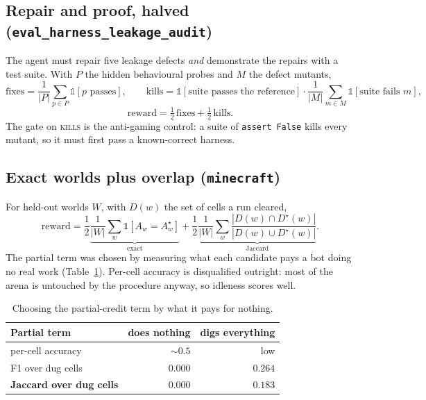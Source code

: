 \documentclass[11pt,a4paper]{article}
\newcommand{\task}[1]{\texttt{#1}}
\begin{document}
\subsection{Repair and proof, halved (\task{eval\_harness\_leakage\_audit})}

The agent must repair five leakage defects \emph{and} demonstrate the repairs with a
test suite. With $P$ the hidden behavioural probes and $M$ the defect mutants,
\begin{equation}
\mathrm{fixes} = \frac{1}{|P|}\sum_{p \in P} \mathbb{1}[p \text{ passes}],
\qquad
\mathrm{kills} = \mathbb{1}[\text{suite passes the reference}] \cdot \frac{1}{|M|}\sum_{m \in M} \mathbb{1}[\text{suite fails } m],
\end{equation}
\begin{equation}
\mathrm{reward} = \tfrac{1}{2}\,\mathrm{fixes} + \tfrac{1}{2}\,\mathrm{kills}.
\end{equation}
The gate on \textsc{kills} is the anti-gaming control: a suite of \texttt{assert
False} kills every mutant, so it must first pass a known-correct harness.

\subsection{Exact worlds plus overlap (\task{minecraft})}

For held-out worlds $W$, with $D(w)$ the set of cells a run cleared,
\begin{equation}
\mathrm{reward} = \frac{1}{2}\underbrace{\frac{1}{|W|}\sum_{w} \mathbb{1}\!\left[A_w = A^{\star}_w\right]}_{\text{exact}}
                + \frac{1}{2}\underbrace{\frac{1}{|W|}\sum_{w} \frac{|D(w) \cap D^{\star}(w)|}{|D(w) \cup D^{\star}(w)|}}_{\text{Jaccard}}.
\end{equation}
The partial term was chosen by measuring what each candidate pays a bot doing no
real work (Table~\ref{tab:mcmetric}). Per-cell accuracy is disqualified outright:
most of the arena is untouched by the procedure anyway, so idleness scores well.

\begin{table}[h]
\centering
\small
\caption{Choosing the partial-credit term by what it pays for nothing.}
\label{tab:mcmetric}
\begin{tabular}{@{}lrr@{}}
\toprule
Partial term & does nothing & digs everything \\
\midrule
per-cell accuracy   & ${\sim}0.5$ & low \\
F1 over dug cells   & $0.000$ & $0.264$ \\
\textbf{Jaccard over dug cells} & $\mathbf{0.000}$ & $\mathbf{0.183}$ \\
\bottomrule
\end{tabular}
\end{table}
\end{document}
